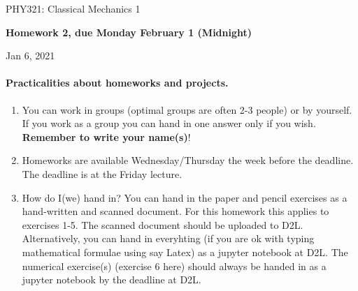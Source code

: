\documentclass[%
oneside,                 %
final,                   %
10pt]{article}
\begin{document}

\newcommand{\exercisesection}[1]{\subsection*{#1}}






\thispagestyle{empty}

\begin{center}
{\LARGE\bf
\begin{spacing}{1.25}
PHY321: Classical Mechanics 1
\end{spacing}
}
\end{center}


\begin{center}
{\bf Homework 2, due Monday February 1 (Midnight)${}^{}$} \\ [0mm]
\end{center}

\begin{center}
\end{center}
    

\begin{center}
Jan 6, 2021
\end{center}

\vspace{1cm}


\paragraph{Practicalities about  homeworks and projects.}
\begin{enumerate}
\item You can work in groups (optimal groups are often 2-3 people) or by yourself. If you work as a group you can hand in one answer only if you wish. \textbf{Remember to write your name(s)}!

\item Homeworks are available Wednesday/Thursday the week before the deadline. The deadline is at the Friday lecture.

\item How do I(we)  hand in?  You can hand in the paper and pencil exercises as a hand-written and scanned  document. For this homework this applies to exercises 1-5. The scanned document should be uploaded to D2L. Alternatively, you can hand in everyhting (if you are ok with typing mathematical formulae using say Latex) as a jupyter notebook at D2L. The numerical exercise(s) (exercise 6 here) should always be handed in as a jupyter notebook by the deadline at D2L. 
\end{enumerate}
\end{document}
